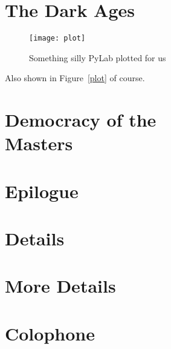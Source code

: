 \documentclass[11pt]{book}
\begin{document}
\chapter{The Dark Ages}
\lipsum[1-2]
\begin{figure}[t]
\centering
\texttt{[image: plot]}
\caption{Something silly PyLab plotted for us}
\label{plot}
\end{figure}
\lipsum[3]
Also shown in Figure~\vref{plot} of course.
\lipsum[4-8]

\chapter[Democracy of the Masters]{Democracy of the\\Masters}
\lipsum[1-10]

\chapter{Epilogue}
\blindmathpaper

\appendix

\chapter{Details}
\lipsum[2-5]

\chapter{More Details}
\lipsum[4-9]

\backmatter

\cleardoublepage
{}
{}
{}


\cleardoublepage
{}
{}
\printindex

\cleardoublepage
\chapter{Colophone}
\lipsum[2]
\end{document}
